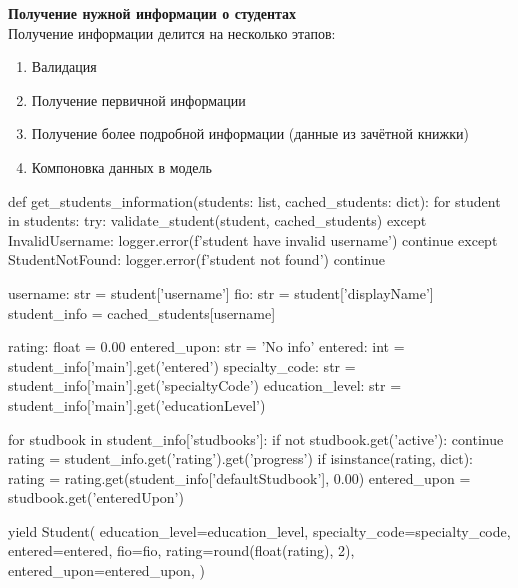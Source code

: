 \documentclass[a4paper,12pt]{article} %
\begin{document}
\textbf{Получение нужной информации о студентах} \\
Получение информации делится на несколько этапов: 
\begin{enumerate}
    \item Валидация
    \item Получение первичной информации
    \item Получение более подробной информации (данные из зачётной книжки)
    \item Компоновка данных в модель
\end{enumerate}
\begin{python}
def get_students_information(students: list, cached_students: dict):
    for student in students:
        try:
            validate_student(student, cached_students)
        except InvalidUsername:
            logger.error(f'{student} have invalid username')
            continue
        except StudentNotFound:
            logger.error(f'{student} not found')
            continue

        username: str = student['username']
        fio: str = student['displayName']
        student_info = cached_students[username]

        rating: float = 0.00
        entered_upon: str = 'No info'
        entered: int = student_info['main'].get('entered')
        specialty_code: str = student_info['main'].get('specialtyCode')
        education_level: str = student_info['main'].get('educationLevel')

        for studbook in student_info['studbooks']:
            if not studbook.get('active'):
                continue
            rating = student_info.get('rating').get('progress')
            if isinstance(rating, dict):
                rating = rating.get(student_info['defaultStudbook'], 0.00)
            entered_upon = studbook.get('enteredUpon')

        yield Student(
            education_level=education_level,
            specialty_code=specialty_code,
            entered=entered,
            fio=fio,
            rating=round(float(rating), 2),
            entered_upon=entered_upon,
        )
\end{python}
\end{document}

